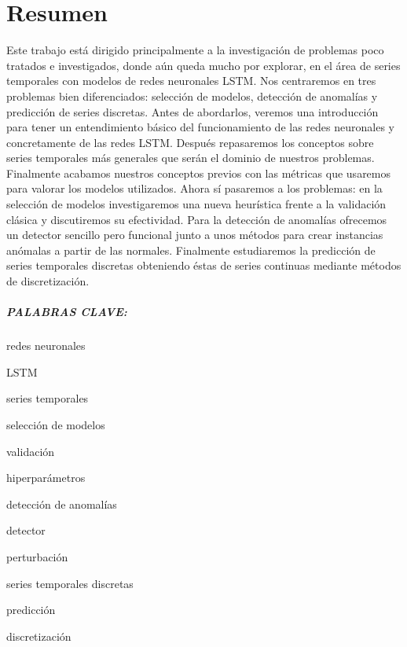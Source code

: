 %


\chapter*{Resumen}\label{ch:resumen}

Este trabajo está dirigido principalmente a la investigación de problemas poco tratados e investigados, donde aún queda mucho por explorar, en el área de series temporales con modelos de redes neuronales LSTM. Nos centraremos en tres problemas bien diferenciados: selección de modelos, detección de anomalías y predicción de series discretas. Antes de abordarlos, veremos una introducción para tener un entendimiento básico del funcionamiento de las redes neuronales y concretamente de las redes LSTM. Después repasaremos los conceptos sobre series temporales más generales que serán el dominio de nuestros problemas. Finalmente acabamos nuestros conceptos previos con las métricas que usaremos para valorar los modelos utilizados. Ahora sí pasaremos a los problemas: en la selección de modelos investigaremos una nueva heurística frente a la validación clásica y discutiremos su efectividad. Para la detección de anomalías ofrecemos un detector sencillo pero funcional junto a unos métodos para crear instancias anómalas a partir de las normales. Finalmente estudiaremos la predicción de series temporales discretas obteniendo éstas de series continuas mediante métodos de discretización.

\paragraph{PALABRAS CLAVE:}
\begin{itemize*}[label=,itemsep=1em,itemjoin=\hspace{1em}]
  \item redes neuronales
  \item LSTM
  \item series temporales
  \item selección de modelos
  \item validación
  \item hiperparámetros
  \item detección de anomalías
  \item detector
  \item perturbación
  \item series temporales discretas
  \item predicción
  \item discretización
\end{itemize*}

\endinput
